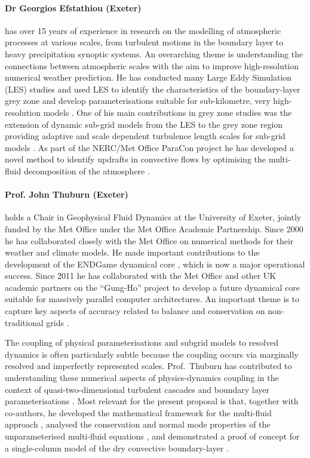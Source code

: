 \documentclass[11pt,a4paper]{article}
\begin{document}
\paragraph*{Dr Georgios Efstathiou (Exeter)} has over 15 years of experience in research on the modelling of
atmospheric processes at various scales, from turbulent motions in the boundary layer
to heavy precipitation synoptic systems. An overarching theme is understanding the
connections between atmospheric scales with the aim to improve high-resolution
numerical weather prediction. He has conducted many Large Eddy Simulation (LES) studies and used LES to identify 
the characteristics of the boundary-layer grey zone \citep[e.g.][]{efstathiou2015}
and develop parameterisations suitable for sub-kilometre, very high-resolution models 
\citep{efstathiou2016}. One of his main contributions in grey zone 
studies was the extension of dynamic sub-grid models from the LES to the grey zone region 
providing adaptive and scale dependent turbulence length scales for sub-grid models 
\citep{efstathiou2018,efstathiou2019a}. As part of the NERC/Met Office ParaCon 
project he has developed a novel method to identify updrafts in convective flows 
by optimising the multi-fluid decomposition of the atmosphere \citep{efstathiou2019b}.

\paragraph*{Prof. John Thuburn (Exeter)} holds a Chair in Geophysical Fluid Dynamics at the University of Exeter, jointly
funded by the Met Office under the Met Office Academic Partnership.
Since 2000 he has collaborated closely with the Met Office on numerical methods for their
weather and climate models. He made important contributions to the development of the
ENDGame dynamical core \cite[e.g.][]{WSW+14}, which is now a major operational success.
Since 2011 he has collaborated with the Met Office and other UK academic partners on the ``Gung-Ho''
project to develop a future dynamical core suitable for massively parallel computer
architectures. An important theme is to capture key aspects of accuracy related to balance and
conservation on non-traditional grids \cite[e.g.][]{TC15}.

The coupling of physical parameterisations and subgrid models to resolved dynamics is often
particularly subtle because the coupling occurs via marginally resolved and imperfectly
represented scales. Prof.\ Thuburn has contributed to understanding these numerical aspects
of physics-dynamics coupling in the context of quasi-two-dimensional turbulent cascades \cite[e.g.][]{TKW14} and boundary layer parameterisations \cite[]{HTW13a}.
Most relevant for the present proposal is that,
together with co-authors, he developed the mathematical framework for the multi-fluid
approach \citep[][]{TWV+18}, analysed the conservation and normal mode properties
of the unparameterised multi-fluid equations \citep[][]{TV18}, and demonstrated
a proof of concept for a single-column model of the dry convective boundary-layer \citep[][]{TEB19}.
\end{document}
